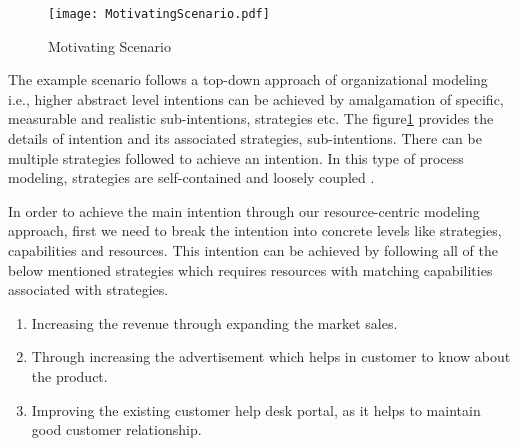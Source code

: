   \begin{figure}
  	\centering
  	\texttt{[image: MotivatingScenario.pdf]}
  	\caption{Motivating Scenario}
  	\label{fig:motivatingscenario}
  \end{figure}
  
The example scenario follows a top-down approach of organizational modeling i.e., higher abstract level intentions can be achieved by amalgamation of specific, measurable and realistic sub-intentions, strategies etc. The figure\ref{fig:motivatingscenario} provides the details of intention and its associated strategies, sub-intentions. There can be multiple strategies followed to achieve an intention. In this type of process modeling, strategies are self-contained and loosely coupled  \cite{Sungur2014a}. 
 
In order to achieve the main intention through our resource-centric modeling approach, first we need to break the intention into concrete levels like strategies, capabilities and resources. This intention can be achieved by following all of the below mentioned strategies which requires resources with matching capabilities associated with strategies. 
 
 \begin{enumerate}
 	\item Increasing the revenue through expanding the market sales. 
 	\item Through increasing the advertisement which helps in customer to know about the product.
 	\item Improving the existing customer help desk portal, as it helps to maintain good customer relationship.
 \end{enumerate}
 
